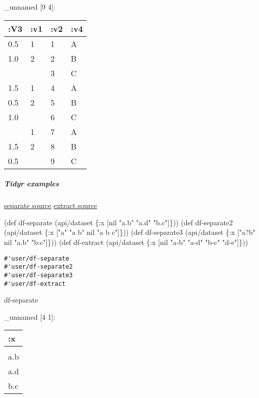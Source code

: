 \documentclass[]{article}
\newenvironment{Shaded}{\begin{snugshade}}{\end{snugshade}}
\newcommand{\AttributeTok}[1]{\textcolor[rgb]{0.77,0.63,0.00}{#1}}
\newcommand{\BuiltInTok}[1]{#1}
\newcommand{\FunctionTok}[1]{\textcolor[rgb]{0.00,0.00,0.00}{#1}}
\newcommand{\NormalTok}[1]{#1}
\newcommand{\StringTok}[1]{\textcolor[rgb]{0.31,0.60,0.02}{#1}}
\newcommand{\VariableTok}[1]{\textcolor[rgb]{0.00,0.00,0.00}{#1}}
\let\oldsubparagraph\subparagraph
\renewcommand{\subparagraph}[1]{\oldsubparagraph{#1}\mbox{}}
\begin{document}
\_unnamed {[}9 4{]}:

\begin{longtable}[]{@{}llll@{}}
\toprule
:V3 & :v1 & :v2 & :v4\tabularnewline
\midrule
\endhead
0.5 & 1 & 1 & A\tabularnewline
1.0 & 2 & 2 & B\tabularnewline
& & 3 & C\tabularnewline
1.5 & 1 & 4 & A\tabularnewline
0.5 & 2 & 5 & B\tabularnewline
1.0 & & 6 & C\tabularnewline
& 1 & 7 & A\tabularnewline
1.5 & 2 & 8 & B\tabularnewline
0.5 & & 9 & C\tabularnewline
\bottomrule
\end{longtable}

\hypertarget{tidyr-examples-1}{%
\subparagraph{Tidyr examples}\label{tidyr-examples-1}}

\href{https://tidyr.tidyverse.org/reference/separate.html}{separate
source}
\href{https://tidyr.tidyverse.org/reference/extract.html}{extract
source}

\begin{Shaded}
\begin{Highlighting}[]
\NormalTok{(}\BuiltInTok{def}\FunctionTok{ df-separate }\NormalTok{(api/dataset \{}\AttributeTok{:x}\NormalTok{ [}\VariableTok{nil} \StringTok{"a.b"} \StringTok{"a.d"} \StringTok{"b.c"}\NormalTok{]\}))}
\NormalTok{(}\BuiltInTok{def}\FunctionTok{ df-separate2 }\NormalTok{(api/dataset \{}\AttributeTok{:x}\NormalTok{ [}\StringTok{"a"} \StringTok{"a b"} \VariableTok{nil} \StringTok{"a b c"}\NormalTok{]\}))}
\NormalTok{(}\BuiltInTok{def}\FunctionTok{ df-separate3 }\NormalTok{(api/dataset \{}\AttributeTok{:x}\NormalTok{ [}\StringTok{"a?b"} \VariableTok{nil} \StringTok{"a.b"} \StringTok{"b:c"}\NormalTok{]\}))}
\NormalTok{(}\BuiltInTok{def}\FunctionTok{ df-extract }\NormalTok{(api/dataset \{}\AttributeTok{:x}\NormalTok{ [}\VariableTok{nil} \StringTok{"a-b"} \StringTok{"a-d"} \StringTok{"b-c"} \StringTok{"d-e"}\NormalTok{]\}))}
\end{Highlighting}
\end{Shaded}

\begin{verbatim}
#'user/df-separate
#'user/df-separate2
#'user/df-separate3
#'user/df-extract
\end{verbatim}

\begin{Shaded}
\begin{Highlighting}[]
\NormalTok{df-separate}
\end{Highlighting}
\end{Shaded}

\_unnamed {[}4 1{]}:

\begin{longtable}[]{@{}l@{}}
\toprule
:x\tabularnewline
\midrule
\endhead
\tabularnewline
a.b\tabularnewline
a.d\tabularnewline
b.c\tabularnewline
\bottomrule
\end{longtable}
\end{document}
